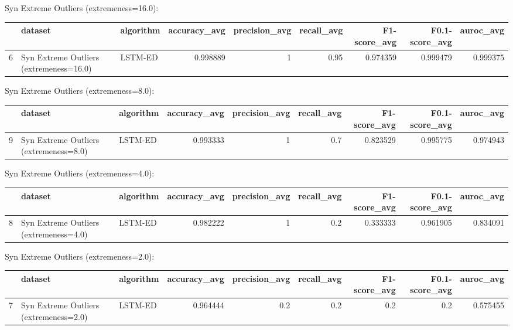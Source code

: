 Syn Extreme Outliers (extremeness=16.0):

\begin{tabular}{rllrrrrrr}
\hline
    & dataset                                 & algorithm   &   accuracy\_avg &   precision\_avg &   recall\_avg &   F1-score\_avg &   F0.1-score\_avg &   auroc\_avg \\
\hline
  6 & Syn Extreme Outliers (extremeness=16.0) & LSTM-ED     &       0.998889 &               1 &         0.95 &       0.974359 &         0.999479 &    0.999375 \\
\hline
\end{tabular}

Syn Extreme Outliers (extremeness=8.0):

\begin{tabular}{rllrrrrrr}
\hline
    & dataset                                & algorithm   &   accuracy\_avg &   precision\_avg &   recall\_avg &   F1-score\_avg &   F0.1-score\_avg &   auroc\_avg \\
\hline
  9 & Syn Extreme Outliers (extremeness=8.0) & LSTM-ED     &       0.993333 &               1 &          0.7 &       0.823529 &         0.995775 &    0.974943 \\
\hline
\end{tabular}

Syn Extreme Outliers (extremeness=4.0):

\begin{tabular}{rllrrrrrr}
\hline
    & dataset                                & algorithm   &   accuracy\_avg &   precision\_avg &   recall\_avg &   F1-score\_avg &   F0.1-score\_avg &   auroc\_avg \\
\hline
  8 & Syn Extreme Outliers (extremeness=4.0) & LSTM-ED     &       0.982222 &               1 &          0.2 &       0.333333 &         0.961905 &    0.834091 \\
\hline
\end{tabular}

Syn Extreme Outliers (extremeness=2.0):

\begin{tabular}{rllrrrrrr}
\hline
    & dataset                                & algorithm   &   accuracy\_avg &   precision\_avg &   recall\_avg &   F1-score\_avg &   F0.1-score\_avg &   auroc\_avg \\
\hline
  7 & Syn Extreme Outliers (extremeness=2.0) & LSTM-ED     &       0.964444 &             0.2 &          0.2 &            0.2 &              0.2 &    0.575455 \\
\hline
\end{tabular}

